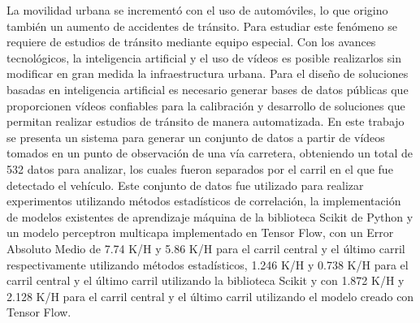 

\begin{spacing}{1.5}

La movilidad urbana se incrementó con el uso de automóviles, lo que origino también un aumento de accidentes de tránsito. Para estudiar este fenómeno se requiere de estudios de tránsito mediante equipo especial. Con los avances tecnológicos, la inteligencia artificial y el uso de vídeos es posible realizarlos sin modificar en gran medida la infraestructura urbana. Para el diseño de soluciones basadas en inteligencia artificial es necesario generar bases de datos públicas que proporcionen vídeos confiables para la calibración y desarrollo de soluciones que permitan realizar estudios de tránsito de manera automatizada. En este trabajo se presenta un sistema para generar un conjunto de datos a partir de vídeos tomados en un punto de observación de una vía carretera, obteniendo un total de 532 datos para analizar, los cuales fueron separados por el carril en el que fue detectado el vehículo. Este conjunto de datos fue utilizado para realizar experimentos utilizando métodos estadísticos de correlación, la implementación de modelos existentes de aprendizaje máquina de la biblioteca Scikit de Python y un modelo perceptron multicapa implementado en Tensor Flow, con un Error Absoluto Medio de 7.74 K/H y 5.86 K/H para el carril central y el último carril respectivamente utilizando métodos estadísticos, 1.246 K/H y 0.738 K/H para el carril central y el último carril utilizando la biblioteca Scikit y con 1.872 K/H y 2.128 K/H para el carril central y el último carril utilizando el modelo creado con Tensor Flow.


\end{spacing}